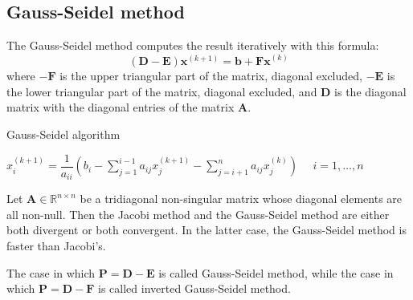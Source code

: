 \documentclass[12pt, a4paper]{report}
\begin{document}
    \subsection{Gauss-Seidel method}
    The Gauss-Seidel method computes the result iteratively with this formula: 
    \[\left(\boldsymbol{D}-\boldsymbol{E}\right)\boldsymbol{x}^{(k+1)}=\boldsymbol{b}+\boldsymbol{Fx}^{(k)}\]
    where $-\boldsymbol{F}$ is the upper triangular part of the matrix, diagonal excluded, $-\boldsymbol{E}$ is the lower triangular part of the matrix, diagonal excluded, and
    $\boldsymbol{D}$ is the diagonal matrix with the diagonal entries of the matrix $\boldsymbol{A}$. 
    \begin{algorithm}[H]
        \caption{Gauss-Seidel algorithm}
            \begin{algorithmic}[1]
                \State $x_i^{(k+1)}=\dfrac{1}{a_{ii}}\left( b_i-\sum_{j=1}^{i-1}a_{ij}x_j^{(k+1)}-\sum_{j=i+1}^{n}a_{ij}x_j^{(k)}\right) \:\:\:\:\:\: i=1,\dots,n $
            \end{algorithmic}
    \end{algorithm}
    \begin{proposition}
        Let $\boldsymbol{A} \in \mathbb{R}^{n \times n}$ be a tridiagonal non-singular matrix whose diagonal elements are all non-null. Then the Jacobi method and the 
        Gauss-Seidel method are either both divergent or both convergent. In the latter case, the Gauss-Seidel method is faster than Jacobi's. 
    \end{proposition}
    The case in which $\boldsymbol{P}=\boldsymbol{D}-\boldsymbol{E}$ is called Gauss-Seidel method, while the case in which $\boldsymbol{P}=\boldsymbol{D}-\boldsymbol{F}$
    is called inverted Gauss-Seidel method. 
\end{document}

